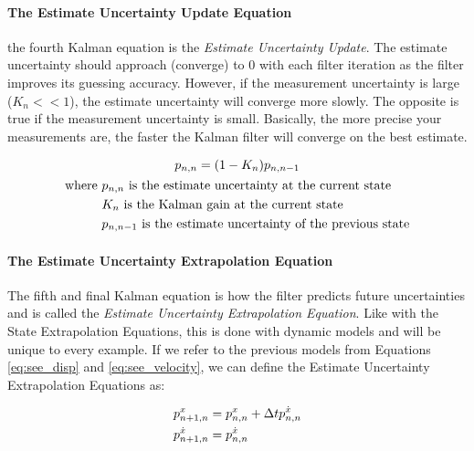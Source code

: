         \paragraph*{The Estimate Uncertainty Update Equation} the fourth Kalman equation is the \textit{Estimate Uncertainty Update}. 
        The estimate uncertainty should approach (converge) to 0 with each filter iteration as the filter improves its guessing accuracy.
        However, if the measurement uncertainty is large ($K_n << 1$), the estimate uncertainty will converge more slowly.
        The opposite is true if the measurement uncertainty is small.
        Basically, the more precise your measurements are, the faster the Kalman filter will converge on the best estimate.

        \begin{gather}
            p_{n,n} = (1-K_n)p_{n,n-1} \\
            \begin{aligned}
                \text{where } &p_{n,n} \text{ is the estimate uncertainty at the current state} \\
                              &K_n \text{ is the Kalman gain at the current state} \\
                              &p_{n,n-1} \text{ is the estimate uncertainty of the previous state}
            \end{aligned} \notag
        \end{gather}

        \paragraph*{The Estimate Uncertainty Extrapolation Equation} The fifth and final Kalman equation is how the filter predicts future uncertainties and is called the \textit{Estimate Uncertainty Extrapolation Equation}. 
        Like with the State Extrapolation Equations, this is done with dynamic models and will be unique to every example.
        If we refer to the previous models from Equations \ref{eq:see_disp} and \ref{eq:see_velocity}, we can define the Estimate Uncertainty Extrapolation Equations as:

        \begin{subequations}
            \labeq{covariance_extrapolation}
            \begin{align}
                p_{n+1,n}^x &= p_{n,n}^x + \Delta t p_{n,n}^{\dot{x}} \\
                p_{n+1,n}^{\dot{x}} &= p_{n,n}^{\dot{x}}
            \end{align}
        \end{subequations}

